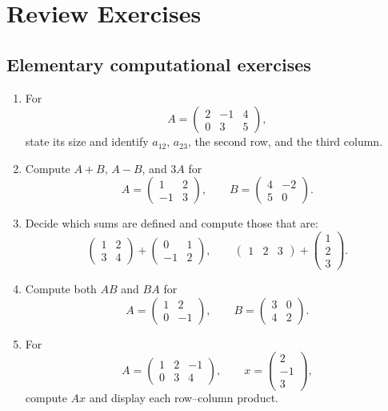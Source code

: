 \section{Review Exercises}

\subsection{Elementary computational exercises}

\begin{enumerate}
\item For
\[
A=\begin{pmatrix}2&-1&4\\0&3&5\end{pmatrix},
\]
state its size and identify $a_{12}$, $a_{23}$, the second row, and the third column.

\item Compute $A+B$, $A-B$, and $3A$ for
\[
A=\begin{pmatrix}1&2\\-1&3\end{pmatrix},
\qquad
B=\begin{pmatrix}4&-2\\5&0\end{pmatrix}.
\]

\item Decide which sums are defined and compute those that are:
\[
\begin{pmatrix}1&2\\3&4\end{pmatrix}+
\begin{pmatrix}0&1\\-1&2\end{pmatrix},
\qquad
\begin{pmatrix}1&2&3\end{pmatrix}+
\begin{pmatrix}1\\2\\3\end{pmatrix}.
\]

\item Compute both $AB$ and $BA$ for
\[
A=\begin{pmatrix}1&2\\0&-1\end{pmatrix},
\qquad
B=\begin{pmatrix}3&0\\4&2\end{pmatrix}.
\]

\item For
\[
A=\begin{pmatrix}1&2&-1\\0&3&4\end{pmatrix},
\qquad
x=\begin{pmatrix}2\\-1\\3\end{pmatrix},
\]
compute $Ax$ and display each row--column product.


\end{enumerate}
